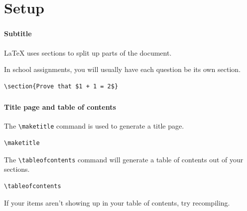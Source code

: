 \documentclass{beamer}
\begin{document}
	\section{Setup}
	\begin{frame}[fragile]
		\frametitle{\secname}
		\framesubtitle{Subtitle}
		\LaTeX{} uses \alert{sections} to split up parts of the document.

		In school assignments, you will usually have each question be its own section.
		\begin{example}
			\begin{lstlisting}[numbers=none, gobble=16]
				\section{Prove that $1 + 1 = 2$}
			\end{lstlisting}
		\end{example}
	\end{frame}
	\begin{frame}[fragile]
		\frametitle{\secname}
		\framesubtitle{Title page and table of contents}
		The \lstinline{\maketitle} command is used to generate a title page.
		\begin{example}
			\begin{lstlisting}[numbers=none, gobble=16]
				\maketitle
			\end{lstlisting}
		\end{example}
		
		The \lstinline{\tableofcontents} command will generate a table of contents out of your sections.
		\begin{example}
			\begin{lstlisting}[numbers=none, gobble=16]
				\tableofcontents
			\end{lstlisting}
		\end{example}
		If your items aren't showing up in your table of contents, try recompiling.
	\end{frame}
\end{document}

